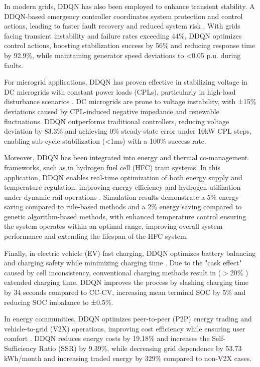 In modern grids, DDQN has also been employed to enhance transient stability. A DDQN-based emergency controller coordinates system protection and control actions, leading to faster fault recovery and reduced system risk \cite{liu2023double}. With grids facing transient instability and failure rates exceeding 44\%, DDQN optimizes control actions, boosting stabilization success by 56\% and reducing response time by 92.9\%, while maintaining generator speed deviations to <0.05 p.u. during faults.

For microgrid applications, DDQN has proven effective in stabilizing voltage in DC microgrids with constant power loads (CPLs), particularly in high-load disturbance scenarios \cite{shahnooshi2024reinforcement}. DC microgrids are prone to voltage instability, with ±15\% deviations caused by CPL-induced negative impedance and renewable fluctuations. DDQN outperforms traditional controllers, reducing voltage deviation by 83.3\% and achieving 0\% steady-state error under 10kW CPL steps, enabling sub-cycle stabilization (<1ms) with a 100\% success rate.

Moreover, DDQN has been integrated into energy and thermal co-management frameworks, such as in hydrogen fuel cell (HFC) train systems. In this application, DDQN enables real-time optimization of both energy supply and temperature regulation, improving energy efficiency and hydrogen utilization under dynamic rail operations \cite{jiang2025collaborative}. Simulation results demonstrate a 5\% energy saving compared to rule-based methods and a 2\% energy saving compared to genetic algorithm-based methods, with enhanced temperature control ensuring the system operates within an optimal range, improving overall system performance and extending the lifespan of the HFC system.

Finally, in electric vehicle (EV) fast charging, DDQN optimizes battery balancing and charging safety while minimizing charging time \cite{yang2023balancing}. Due to the "cask effect" caused by cell inconsistency, conventional charging methods result in ($>$20\% ) extended charging time. DDQN improves the process by slashing charging time by 34 seconds compared to CC-CV, increasing mean terminal SOC by 5\% and reducing SOC imbalance to ±0.5\%.

In energy communities, DDQN optimizes peer-to-peer (P2P) energy trading and vehicle-to-grid (V2X) operations, improving cost efficiency while ensuring user comfort \cite{yavuz2024optimization}. DDQN reduces energy costs by 19.18\% and increases the Self-Sufficiency Ratio (SSR) by 9.39\%, while decreasing grid dependence by 53.73 kWh/month and increasing traded energy by 329\% compared to non-V2X cases.

